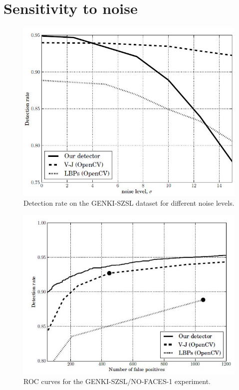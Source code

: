 \documentclass[a4paper,12pt]{article}
\begin{document}
\section{Sensitivity to noise}
\begin{figure}[ht]
  \centering
  \includegraphics[width=\textwidth, keepaspectratio=true]{ObjectDetectionPixelIntensityFig6-.jpg}
  \caption{Detection rate on the GENKI-SZSL dataset for different noise levels.}
 \label{fig:fig6}
\end{figure}

\begin{figure}[h!]
  \centering
  \includegraphics[width=\textwidth, keepaspectratio=true]{ObjectDetectionPixelIntensityFig2.jpg}
  \caption{ROC curves for the GENKI-SZSL/NO-FACES-1 experiment.}
 \label{fig:fig2}
\end{figure}
\end{document}
